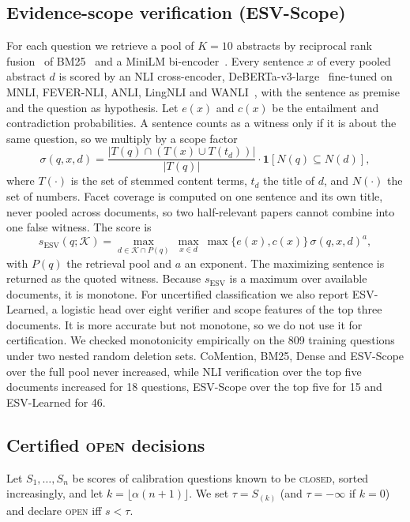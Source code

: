 \documentclass[conference,a4paper]{IEEEtran}
\theoremstyle{definition}
\newcommand{\open}{\textup{\textsc{open}}}
\newcommand{\closed}{\textup{\textsc{closed}}}
\begin{document}
\subsection{Evidence-scope verification (ESV-Scope)}
For each question we retrieve a pool of $K=10$ abstracts by reciprocal rank fusion~\cite{cormack2009} of BM25~\cite{robertson2009} and a MiniLM bi-encoder~\cite{reimers2019,wang2020minilm}. Every sentence $x$ of every pooled abstract $d$ is scored by an NLI cross-encoder, DeBERTa-v3-large~\cite{he2023debertav3} fine-tuned on MNLI, FEVER-NLI, ANLI, LingNLI and WANLI~\cite{laurer2024}, with the sentence as premise and the question as hypothesis. Let $e(x)$ and $c(x)$ be the entailment and contradiction probabilities. A sentence counts as a witness only if it is about the same question, so we multiply by a scope factor
\begin{equation}
\sigma(q,x,d)=\frac{|T(q)\cap(T(x)\cup T(t_d))|}{|T(q)|}\cdot \mathbf{1}[N(q)\subseteq N(d)],
\end{equation}
where $T(\cdot)$ is the set of stemmed content terms, $t_d$ the title of $d$, and $N(\cdot)$ the set of numbers. Facet coverage is computed on one sentence and its own title, never pooled across documents, so two half-relevant papers cannot combine into one false witness. The score is
\begin{equation}
s_{\mathrm{ESV}}(q;\mathcal{K})=\max_{d\in\mathcal{K}\cap P(q)}\ \max_{x\in d}\ \max\{e(x),c(x)\}\,\sigma(q,x,d)^{a},
\end{equation}
with $P(q)$ the retrieval pool and $a$ an exponent. The maximizing sentence is returned as the quoted witness. Because $s_{\mathrm{ESV}}$ is a maximum over available documents, it is monotone. For uncertified classification we also report ESV-Learned, a logistic head over eight verifier and scope features of the top three documents. It is more accurate but not monotone, so we do not use it for certification. We checked monotonicity empirically on the 809 training questions under two nested random deletion sets. CoMention, BM25, Dense and ESV-Scope over the full pool never increased, while NLI verification over the top five documents increased for 18 questions, ESV-Scope over the top five for 15 and ESV-Learned for 46.

\subsection{Certified \open{} decisions}
Let $S_1,\dots,S_n$ be scores of calibration questions known to be \closed{}, sorted increasingly, and let $k=\lfloor\alpha(n+1)\rfloor$. We set $\tau=S_{(k)}$ (and $\tau=-\infty$ if $k=0$) and declare \open{} iff $s<\tau$.
\end{document}
